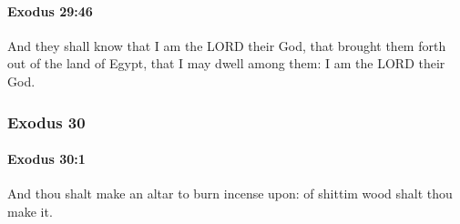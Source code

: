 		\paragraph{Exodus 29:46} %
			\label{EXODUS-29-46}

			And they shall know that I am the LORD their God, that brought them forth out of the land of Egypt, that I may dwell among them: I am the LORD their God.

	\subsubsection{Exodus 30} %
		\label{EXODUS-30}

		\paragraph{Exodus 30:1} %
			\label{EXODUS-30-1}

			And thou shalt make an altar to burn incense upon: of shittim wood shalt thou make it.

